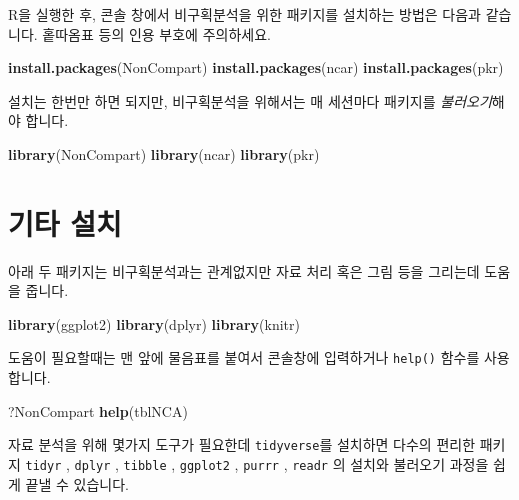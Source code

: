 \documentclass[
  10pt,
]{krantz}
\makeatletter
\newenvironment{Shaded}{\begin{snugshade}}{\end{snugshade}}
\newcommand{\KeywordTok}[1]{\textcolor[rgb]{0.13,0.29,0.53}{\textbf{#1}}}
\newcommand{\NormalTok}[1]{#1}
\newcommand{\StringTok}[1]{\textcolor[rgb]{0.31,0.60,0.02}{#1}}
\newenvironment{kframe}{%
\medskip{}
\setlength{\fboxsep}{.8em}
 \def\at@end@of@kframe{}%
 \ifinner\ifhmode%
  \def\at@end@of@kframe{\end{minipage}}%
  \begin{minipage}{\columnwidth}%
 \fi\fi%
 \def\FrameCommand##1{\hskip\@totalleftmargin \hskip-\fboxsep
 \colorbox{shadecolor}{##1}\hskip-\fboxsep
     \hskip-\linewidth \hskip-\@totalleftmargin \hskip\columnwidth}%
 \MakeFramed {\advance\hsize-\width
   \@totalleftmargin\z@ \linewidth\hsize
   \@setminipage}}%
 {\par\unskip\endMakeFramed%
 \at@end@of@kframe}
\renewenvironment{Shaded}{\begin{kframe}}{\end{kframe}}
\makeatother
\begin{document}
R을 실행한 후, 콘솔 창에서 비구획분석을 위한 패키지를 설치하는 방법은 다음과 같습니다.
홑따옴표 등의 인용 부호에 주의하세요.

\begin{Shaded}
\begin{Highlighting}[]
\KeywordTok{install.packages}\NormalTok{(}\StringTok{\textquotesingle{}NonCompart\textquotesingle{}}\NormalTok{)}
\KeywordTok{install.packages}\NormalTok{(}\StringTok{\textquotesingle{}ncar\textquotesingle{}}\NormalTok{)}
\KeywordTok{install.packages}\NormalTok{(}\StringTok{\textquotesingle{}pkr\textquotesingle{}}\NormalTok{)}
\end{Highlighting}
\end{Shaded}

설치는 한번만 하면 되지만, 비구획분석을 위해서는 매 세션마다 패키지를 \emph{불러오기}해야 합니다.

\begin{Shaded}
\begin{Highlighting}[]
\KeywordTok{library}\NormalTok{(NonCompart)}
\KeywordTok{library}\NormalTok{(ncar)}
\KeywordTok{library}\NormalTok{(pkr)}
\end{Highlighting}
\end{Shaded}

\hypertarget{otherinstall}{%
\section{기타 설치}\label{otherinstall}}

아래 두 패키지는 비구획분석과는 관계없지만 자료 처리 혹은 그림 등을 그리는데 도움을 줍니다.

\begin{Shaded}
\begin{Highlighting}[]
\KeywordTok{library}\NormalTok{(ggplot2) }
\KeywordTok{library}\NormalTok{(dplyr) }
\KeywordTok{library}\NormalTok{(knitr) }
\end{Highlighting}
\end{Shaded}

도움이 필요할때는 맨 앞에 물음표를 붙여서 콘솔창에 입력하거나 \texttt{help()} 함수를 사용합니다.

\begin{Shaded}
\begin{Highlighting}[]
\NormalTok{?NonCompart}
\KeywordTok{help}\NormalTok{(tblNCA)}
\end{Highlighting}
\end{Shaded}

자료 분석을 위해 몇가지 도구가 필요한데 \texttt{tidyverse}\citep{R-tidyverse}를 설치하면 다수의 편리한 패키지 \texttt{tidyr} \citep{R-tidyr}, \texttt{dplyr} \citep{R-dplyr}, \texttt{tibble} \citep{R-tibble}, \texttt{ggplot2} \citep{R-ggplot2}, \texttt{purrr} \citep{R-purrr}, \texttt{readr} \citep{R-readr}의 설치와 불러오기 과정을 쉽게 끝낼 수 있습니다.
\end{document}
